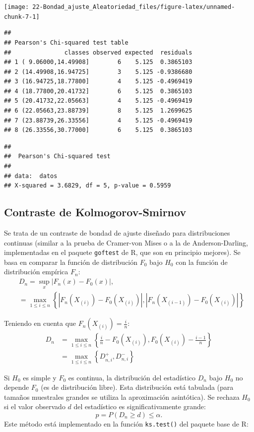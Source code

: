 \documentclass[
]{book}
\theoremstyle{break}
\theoremstyle{nonumberplain}
\begin{document}
\begin{center}\texttt{[image: 22-Bondad\_ajuste\_Aleatoriedad\_files/figure-latex/unnamed-chunk-7-1]} \end{center}

\begin{verbatim}
## 
## Pearson's Chi-squared test table
##               classes observed expected  residuals
## 1 ( 9.06000,14.49908]        6    5.125  0.3865103
## 2 (14.49908,16.94725]        3    5.125 -0.9386680
## 3 (16.94725,18.77800]        4    5.125 -0.4969419
## 4 (18.77800,20.41732]        6    5.125  0.3865103
## 5 (20.41732,22.05663]        4    5.125 -0.4969419
## 6 (22.05663,23.88739]        8    5.125  1.2699625
## 7 (23.88739,26.33556]        4    5.125 -0.4969419
## 8 (26.33556,30.77000]        6    5.125  0.3865103
\end{verbatim}

\begin{verbatim}
## 
##  Pearson's Chi-squared test
## 
## data:  datos
## X-squared = 3.6829, df = 5, p-value = 0.5959
\end{verbatim}

\hypertarget{ks-test}{%
\subsection{Contraste de Kolmogorov-Smirnov}\label{ks-test}}

Se trata de un contraste de bondad de ajuste diseñado para distribuciones continuas
(similar a la prueba de Cramer-von Mises o a la de Anderson-Darling, implementadas en el paquete \texttt{goftest} de R, que son en principio mejores).
Se basa en comparar la función de distribución \(F_0\) bajo \(H_0\) con la función de distribución empírica \(F_n\):
\[\begin{aligned}
& D_n=\sup_{x}|F_n(x)-F_0(x)|,\\
& = \max_{1 \leq i \leq n} \left\{ |F_n(X_{(i)})-F_0(X_{(i)})|,|F_n(X_{(i-1)})-F_0(X_{(i)})| \right\}
\end{aligned}\]

Teniendo en cuenta que \(F_n\left( X_{(i)}\right) = \frac{i}n\):
\[\begin{aligned}
D_n  & =\max_{1\leq i\leq n}\left \{  \frac{i}n-F_0(X_{(i)}),F_0(X_{(i)})-\frac{i-1}n\right \} \\
& =\max_{1\leq i\leq n}\left \{  D_{n,i}^{+},D_{n,i}^{-}\right \}
\end{aligned}\]

Si \(H_0\) es simple y \(F_0\) es continua, la distribución del estadístico \(D_n\) bajo \(H_0\) no depende \(F_0\) (es de distribución libre).
Esta distribución está tabulada (para tamaños muestrales grandes se utiliza la aproximación asintótica).
Se rechaza \(H_0\) si el valor observado \(d\) del estadístico es significativamente grande:
\[p = P \left( D_n \geq d \right) \leq \alpha.\]
Este método está implementado en la función \texttt{ks.test()} del paquete base de R:
\end{document}
